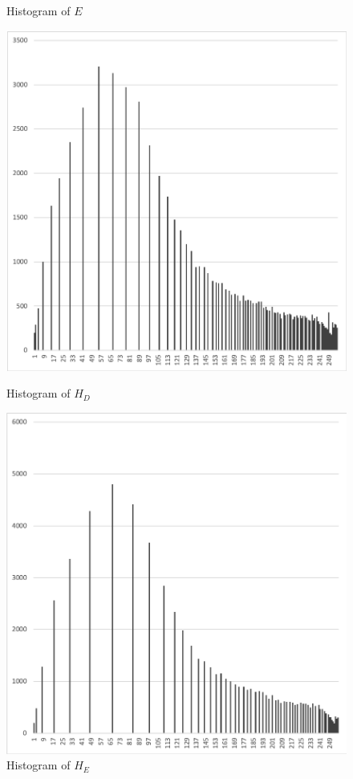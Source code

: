 \documentclass[12pt,a4paper,notitlepage,oneside,amsmath,amssymb]{article}
\begin{document}
\begin{CJK*}{UTF8}{bkai}
\begin{enumerate}[label=(\alph*)]
\begin{figure}[hbt!]
\begin{minipage}{.25\textwidth}
              \caption*{Histogram of \(E\)}
            \end{minipage}%
            \begin{minipage}{.25\textwidth}
              \centering
              \includegraphics[width=.95\linewidth]{hist_HD}
              \caption*{Histogram of \(H_D\)}
            \end{minipage}%
            \begin{minipage}{.25\textwidth}
              \centering
              \includegraphics[width=.95\linewidth]{hist_HE}
              \caption*{Histogram of \(H_E\)}
            \end{minipage}
          \end{figure}


\end{enumerate}
\end{CJK*}
\end{document}
